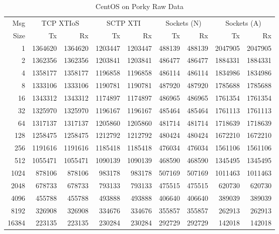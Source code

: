 \documentclass[letterpaper,final,notitlepage,twocolumn,10pt,twoside]{article}
\begin{document}
\begin{appendix}
\begin{table}[hbp]
\footnotesize
\begin{center}
\setlength{\tabcolsep}{0.2em}
\setlength{\arraycolsep}{0.2em}
\begin{tabular}{rrrrrrrrr}\\
Msg & \multicolumn{2}{c}{TCP XTIoS} & \multicolumn{2}{c}{SCTP XTI} & \multicolumn{2}{c}{Sockets (N)} & \multicolumn{2}{c}{Sockets (A)}\\
Size & Tx & Rx & Tx & Rx & Tx & Rx & Tx & Rx\\
\hline
\hline
1 & 1364620 & 1364620 & 1203447 & 1203447 & 488139 & 488139 & 2047905 & 2047905\\
2 & 1362356 & 1362356 & 1203841 & 1203841 & 486477 & 486477 & 1884331 & 1884331\\
4 & 1358177 & 1358177 & 1196858 & 1196858 & 486114 & 486114 & 1834986 & 1834986\\
8 & 1333106 & 1333106 & 1190781 & 1190781 & 487920 & 487920 & 1785688 & 1785688\\
16 & 1343312 & 1343312 & 1174897 & 1174897 & 486965 & 486965 & 1761354 & 1761354\\
32 & 1325970 & 1325970 & 1196167 & 1196167 & 485464 & 485464 & 1761113 & 1761113\\
64 & 1317137 & 1317137 & 1205860 & 1205860 & 481714 & 481714 & 1718639 & 1718639\\
128 & 1258475 & 1258475 & 1212792 & 1212792 & 480424 & 480424 & 1672210 & 1672210\\
256 & 1191616 & 1191616 & 1185418 & 1185418 & 476034 & 476034 & 1561106 & 1561106\\
512 & 1055471 & 1055471 & 1090139 & 1090139 & 468590 & 468590 & 1345495 & 1345495\\
1024 & 878106 & 878106 & 983178 & 983178 & 507169 & 507169 & 1011463 & 1011463\\
2048 & 678733 & 678733 & 793133 & 793133 & 475515 & 475515 & 620730 & 620730\\
4096 & 455788 & 455788 & 493888 & 493888 & 406640 & 406640 & 389039 & 389039\\
8192 & 326908 & 326908 & 334676 & 334676 & 355857 & 355857 & 262913 & 262913\\
16384 & 223135 & 223135 & 230284 & 230284 & 292729 & 292729 & 142018 & 142018\\
\hline
\end{tabular}
\end{center}
\normalsize
\caption[CentOS on Porky Raw Data]{CentOS on Porky Raw Data}
\label{table:centosdata}
\end{table}


\end{appendix}
\end{document}
